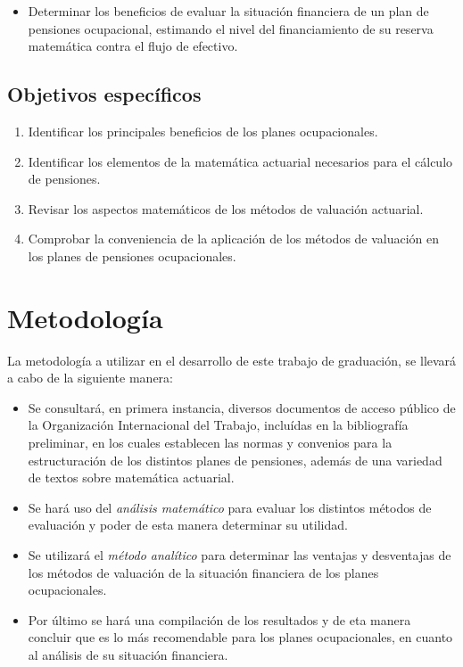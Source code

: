 \documentclass[12pt,letterpaper,titlepage]{article}
\begin{document}
\begin{itemize}
	\item Determinar los beneficios de evaluar la situación financiera de un plan de pensiones ocupacional, estimando el nivel del financiamiento de su reserva matemática contra el flujo de efectivo.
\end{itemize}


\subsection{Objetivos específicos}

\begin{enumerate}
	\item Identificar los principales beneficios de los planes ocupacionales.
	\item Identificar los elementos de la matemática actuarial necesarios para el cálculo de pensiones.
	\item Revisar los aspectos matemáticos de los métodos de valuación actuarial.
	\item Comprobar la conveniencia de la aplicación de los métodos de valuación en los planes de pensiones ocupacionales. 
\end{enumerate}

\newpage

\section{Metodología}

La metodología a utilizar en el desarrollo de este trabajo de graduación, se llevará a cabo de la siguiente manera:

\begin{itemize}
	\item Se consultará, en primera instancia, diversos documentos de acceso público de la Organización Internacional del Trabajo, incluídas en la bibliografía preliminar,  en los cuales establecen las normas y convenios para la estructuración de los distintos planes de pensiones, además de una variedad de textos sobre matemática actuarial.
	
	\item Se hará uso del \textit{análisis matemático} para evaluar los distintos métodos de evaluación y poder de esta manera determinar su utilidad.
	 
	\item Se utilizará el \textit{método analítico} para determinar las ventajas y desventajas de los métodos de valuación de la situación financiera de los planes ocupacionales.
	
	\item Por último se hará una compilación de los resultados y de eta manera concluir que es lo más recomendable para los planes ocupacionales, en cuanto al análisis de su situación financiera.
\end{itemize}
\end{document}
